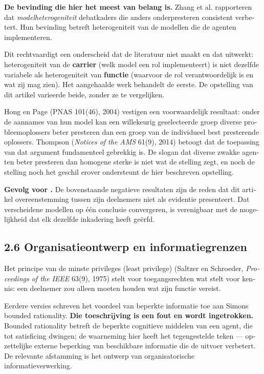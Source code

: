 \begin{dutch}
\textbf{De bevinding die hier het meest van belang is.} \gcheck{} Zhang et al. rapporteren dat \emph{modelheterogeniteit} debatkaders die anders onderpresteren consistent verbetert. Hun bevinding betreft heterogeniteit van de modellen die de agenten implementeren.

Dit rechtvaardigt een onderscheid dat de literatuur niet maakt en dat  uitwerkt: heterogeniteit van de \textbf{carrier} (welk model een rol implementeert) is niet dezelfde variabele als heterogeniteit van \textbf{functie} (waarvoor de rol verantwoordelijk is en wat zij mag zien). Het aangehaalde werk behandelt de eerste. De opstelling van dit artikel varieerde beide, zonder ze te vergelijken.

\gcheck{} Hong en Page (PNAS 101(46), 2004) vestigen een voorwaardelijk resultaat: onder de aannames van hun model kan een willekeurig geselecteerde groep diverse probleemoplossers beter presteren dan een groep van de individueel best presterende oplossers. \gcheck{} Thompson (\emph{Notices of the AMS} 61(9), 2014) betoogt dat de toepassing van dat argument fundamenteel gebrekkig is. De slogan dat diverse zwakke agenten beter presteren dan homogene sterke is niet wat de stelling zegt, en noch de stelling noch het geschil erover ondersteunt de hier beschreven opstelling.

\textbf{Gevolg voor .} De bovenstaande negatieve resultaten zijn de reden dat dit artikel overeenstemming tussen zijn deelnemers niet als evidentie presenteert. Dat verscheidene modellen op één conclusie convergeren, is verenigbaar met de mogelijkheid dat elk dezelfde inkadering heeft geërfd.


\subsection*{2.6 Organisatieontwerp en informatiegrenzen}
\label{sec:nl:2.6}

\gcheck{} Het principe van de minste privileges (least privilege) (Saltzer en Schroeder, \emph{Proceedings of the IEEE} 63(9), 1975) stelt voor toegangsrechten wat  stelt voor kennis: een deelnemer zou alleen moeten houden wat zijn functie vereist.

Eerdere versies schreven het voordeel van beperkte informatie toe aan Simons bounded rationality. \textbf{Die toeschrijving is een fout en wordt ingetrokken.} Bounded rationality betreft de beperkte cognitieve middelen van een agent, die tot satisficing dwingen; de waarneming hier heeft het tegengestelde teken — opzettelijke externe beperking van beschikbare informatie die de uitvoer verbetert. De relevante afstamming is het ontwerp van organisatorische informatieverwerking.



\end{dutch}
